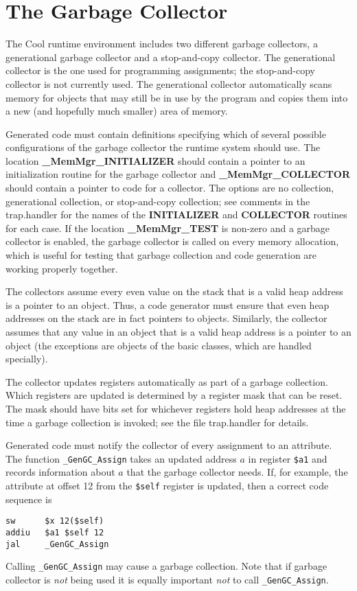 \documentclass[11pt]{article}
\def\U#1{{\sf{}#1}}
\def\C#1{{\bf{}#1}}
\begin{document}
\section{The Garbage Collector}

The Cool runtime environment includes two different garbage
collectors, a generational garbage collector and a stop-and-copy
collector.  The generational collector is the one used for programming
assignments; the stop-and-copy collector is not currently used.  The
generational collector automatically scans memory for objects that may
still be in use by the program and copies them into a new (and
hopefully much smaller) area of memory.

Generated code must contain definitions specifying which of several
possible configurations of the garbage collector the runtime system should
use.  The location \C{\_MemMgr\_INITIALIZER} should contain a pointer
to an initialization routine for the garbage collector and 
\C{\_MemMgr\_COLLECTOR} should contain a pointer to code for a collector.
The options are no collection, generational collection, or stop-and-copy
collection; see comments in the \U{trap.handler} for the names of the
\C{INITIALIZER} and \C{COLLECTOR} routines for each case.  If the
location \C{\_MemMgr\_TEST} is non-zero and a garbage collector is enabled,
the garbage collector is called on every memory allocation, which is useful
for testing that garbage collection and code generation are working properly
together.

The collectors assume every even value on the stack that is a valid heap
address is a pointer to an object.  Thus, a code generator must ensure
that even heap addresses on the stack are in fact pointers to objects.
Similarly, the collector assumes that any value in an object that is
a valid heap address is a pointer to an object (the exceptions are objects
of the basic classes, which are handled specially).

The collector updates registers automatically as part of a garbage collection.
Which registers are updated is determined by a register mask that can be
reset.  The mask should have bits set for whichever registers hold heap
addresses at the time a garbage collection is invoked; see the file
\U{trap.handler} for details.

Generated code must notify the collector of every assignment to an
attribute.  The function {\tt \_GenGC\_Assign} takes an updated
address $a$ in register {\tt \$a1} and records information about $a$
that the garbage collector needs.  If, for example, the attribute at
offset 12 from the {\tt \$self} register is updated, then a correct
code sequence is
\begin{verbatim}
sw      $x 12($self)
addiu   $a1 $self 12
jal     _GenGC_Assign
\end{verbatim}
Calling {\tt \_GenGC\_Assign} may cause a garbage collection.  Note
that if garbage collector is {\em not} being used it is equally important
{\em not} to call {\tt \_GenGC\_Assign}.  
\end{document}
